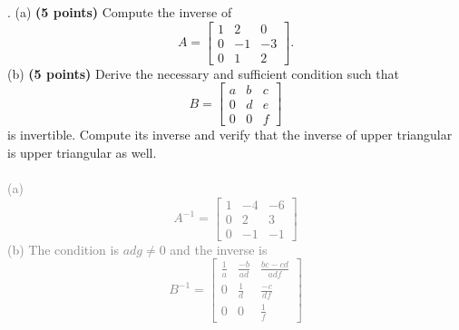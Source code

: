 \documentclass[12pt,a4paper]{article}
\newcommand{\gray}[1]{\textcolor{gray}{#1}}
\renewcommand{\l}{\left}
\renewcommand{\r}{\right}
\begin{document}
\newpage
{}. 
(a) \textbf{(5 points)} Compute the inverse of 
\begin{equation*}
	A = \l[
	\begin{array}{ccc}
		1 & 2 & 0 \\
		0 & -1 & -3 \\
		0 & 1 & 2
	\end{array}
	\r].
\end{equation*}
(b) \textbf{(5 points)} Derive the necessary and sufficient condition such that  
\begin{equation*}
	B = \l[
	\begin{array}{ccc}
		a & b & c\\
		0 & d & e \\
		0 & 0 & f
	\end{array}
	\r]
\end{equation*}
is invertible. Compute its inverse and verify that the inverse of upper triangular is upper triangular as well. \\
\\
\gray{
	(a)
	\begin{equation*}
	A^{-1} = \l[
	\begin{array}{ccc}
		1 & -4 & -6 \\
		0 & 2 & 3 \\
		0 & -1 & -1
	\end{array}
	\r]
	\end{equation*}
	(b) The condition is $adg \neq 0$ and the inverse is
	\begin{equation*}
	B^{-1} = \l[
	\begin{array}{ccc}
	    \frac1a & \frac{-b}{ad} & \frac{bc-cd}{adf} \\
	    0 & \frac1d & \frac{-c}{df} \\
	    0 & 0 & \frac1f
	\end{array}
	\r]
	\end{equation*}
}
\end{document}
